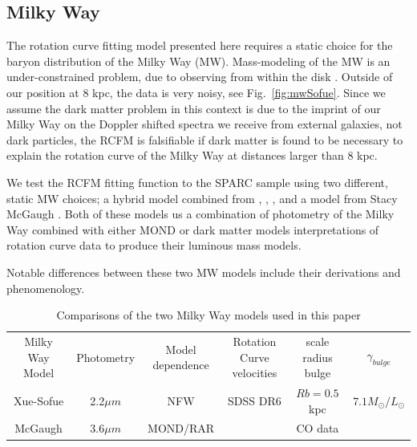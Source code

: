 \documentclass[reprint,%
 amsmath,amssymb,
 aps,
]{revtex4-1}
\begin{document}
\subsection{Milky Way}

The rotation curve fitting model presented here requires a static choice for the baryon distribution of the   Milky Way (MW).   Mass-modeling of the MW is an under-constrained problem, due to     observing from       within  the disk  \cite{1991ARA&A..29..409F}.
 Outside of our position at 8 kpc, the data is very 
 noisy, see  Fig.~\ref{fig:mwSofue}.
 Since we assume   the dark matter problem in this context is due to the imprint of our Milky Way on the Doppler shifted spectra we receive from external galaxies, not dark particles, the RCFM    is   falsifiable  if dark matter is found to be necessary to explain the rotation curve of the Milky Way at distances larger than 8 kpc.   
 
 
 We test the RCFM fitting function to the SPARC sample using two different, static MW choices; 
   a hybrid model combined from  \citet{Xue}, 
  \citet{Sofue}, \cite{sofue2009unified}, and 
  a model from Stacy McGaugh \cite{McGaugh_2019}. Both of these models us a combination of photometry of the Milky Way combined with either MOND or dark matter models interpretations of rotation curve data to produce their luminous mass models. 

  Notable differences between these two MW models include their derivations and   phenomenology.
  \begin{table}[]
      \centering
      \begin{tabular}{|c|c|c|c|c|c|}
        Milky Way Model & Photometry                        & Model dependence  & Rotation Curve velocities & scale radius bulge &$\gamma_{bulge}$\\
          
          Xue-Sofue     &  2.2$ \mu m$& NFW \cite{1996ApJ...462..563N}     &\citet{Xue} SDSS DR6       & $Rb = 0.5$ kpc    &$  7.1 M_\odot /L_\odot$  \\
    
         McGaugh       & 3.6$\mu m$ &MOND/RAR&                              & \cite{2006ApJ...641..938L}CO data  &&
      \end{tabular}
      \caption{Comparisons of the two Milky Way models used in this paper}
      \label{tab:my_label}
  \end{table}
  
\end{document}
